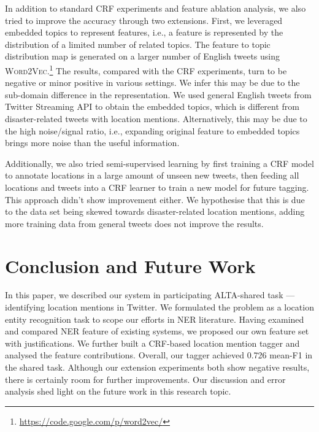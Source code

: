 \documentclass[11pt]{article}
\newcommand{\ie}{i.e.,\xspace}
\newcommand{\wordvec}{\textsc{Word2Vec}\xspace}
\newcommand{\myurl}[1]{{\footnotesize\url{#1}}}
\begin{document}
In addition to standard CRF experiments and feature ablation analysis, we also tried to improve the accuracy through two extensions.
First, we leveraged embedded topics to represent features, \ie a feature is represented by the distribution of a limited number of related topics.
The feature to topic distribution map is generated on a larger number of English tweets using \wordvec.\footnote{\myurl{https://code.google.com/p/word2vec/}}
The results, compared with the CRF experiments, turn to be negative or minor positive in various settings.
We infer this may be due to the sub-domain difference in the representation.
We used general English tweets from Twitter Streaming API to obtain the embedded topics, which is different from disaster-related tweets with location mentions.
Alternatively, this may be due to the high noise/signal ratio, \ie expanding original feature to embedded topics brings more noise than the useful information.

Additionally, we also tried semi-supervised learning by first training a CRF model to annotate locations in a large amount of unseen new tweets, then feeding all locations and tweets into a CRF learner to train a new model for future tagging.
This approach didn't show improvement either.
We hypothesise that this is due to the data set being skewed towards disaster-related location mentions, adding more training data from general tweets does not improve the results.

\section{Conclusion and Future Work}
\label{sec:conclusion}
In this paper, we described our system in participating ALTA-shared task --- identifying location mentions in Twitter.
We formulated the problem as a location entity recognition task to scope our efforts in NER literature.
Having examined and compared NER feature of existing systems, we proposed our own feature set with justifications.
We further built a CRF-based location mention tagger and analysed the feature contributions.
Overall, our tagger achieved 0.726 mean-F1 in the shared task.
Although our extension experiments both show negative results, there is certainly room for further improvements.
Our discussion and error analysis shed light on the future work in this research topic.



\end{document}

